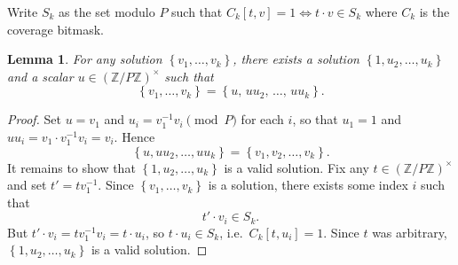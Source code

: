 \documentclass{report}
\newcommand{\set}[1]{\left\{ #1 \right\}}
\newtheorem{lemma}{Lemma}
\begin{document}
 
Write $S_k$ as the set modulo $P$ such that $C_k[t, v] = 1 \iff t \cdot v \in S_k$ where $C_k$ is the coverage bitmask. 
 
\begin{lemma}
For any solution $\set{v_1, \dots, v_k}$, there exists a solution $\set{1, u_2, \dots, u_k}$
and a scalar $u \in (\mathbb{Z}/P\mathbb{Z})^\times$ such that
\[
    \set{v_1, \dots, v_k} = \set{u,\, u u_2,\, \dots,\, u u_k}.
\]
\end{lemma}
 
\begin{proof}
Set $u = v_1$ and $u_i = v_1^{-1} v_i \pmod{P}$ for each $i$, so that $u_1 = 1$ and
$u u_i = v_1 \cdot v_1^{-1} v_i = v_i$. Hence
\[
    \set{u, u u_2, \dots, u u_k} = \set{v_1, v_2, \dots, v_k}.
\]
It remains to show that $\set{1, u_2, \dots, u_k}$ is a valid solution.
Fix any $t \in (\mathbb{Z}/P\mathbb{Z})^\times$ and set $t' = t v_1^{-1}$.
Since $\set{v_1, \dots, v_k}$ is a solution, there exists some index $i$ such that
\[
    t' \cdot v_i \in S_k.
\]
But $t' \cdot v_i = t v_1^{-1} v_i = t \cdot u_i$, so $t \cdot u_i \in S_k$,
i.e.\ $C_k[t, u_i] = 1$. Since $t$ was arbitrary, $\set{1, u_2, \dots, u_k}$ is a valid solution.
\end{proof}
\end{document}
